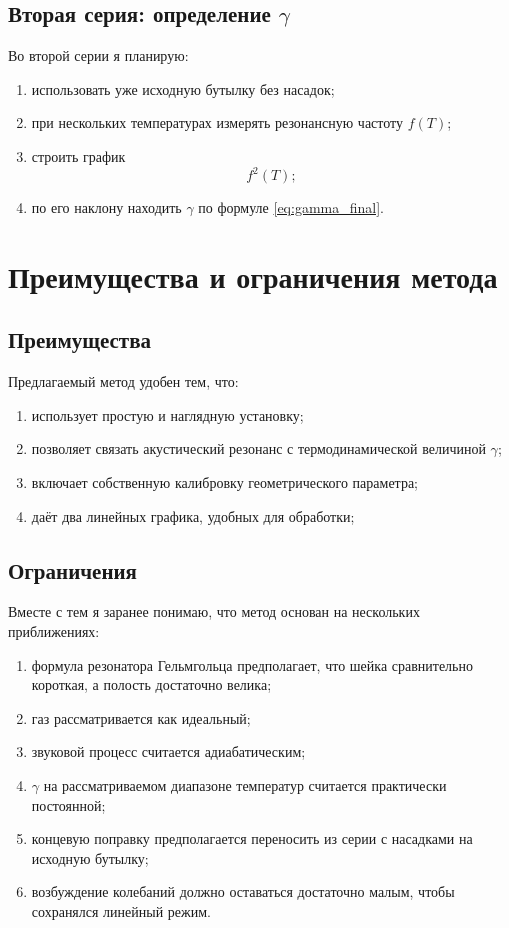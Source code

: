 \documentclass[a4paper,12pt]{article}
\begin{document}
	\subsection{Вторая серия: определение \(\gamma\)}
	
	Во второй серии я планирую:
	\begin{enumerate}[label=\arabic*)]
		\item использовать уже исходную бутылку без насадок;
		\item при нескольких температурах измерять резонансную частоту \(f(T)\);
		\item строить график
		\[
		f^2(T);
		\]
		\item по его наклону находить \(\gamma\) по формуле \eqref{eq:gamma_final}.
	\end{enumerate}
	
	\section{Преимущества и ограничения метода}
	
	\subsection{Преимущества}
	
	Предлагаемый метод удобен тем, что:
	\begin{enumerate}[label=\arabic*)]
		\item использует простую и наглядную установку;
		\item позволяет связать акустический резонанс с термодинамической величиной \(\gamma\);
		\item включает собственную калибровку геометрического параметра;
		\item даёт два линейных графика, удобных для обработки;
		
	\end{enumerate}
	
	\subsection{Ограничения}
	
	Вместе с тем я заранее понимаю, что метод основан на нескольких приближениях:
	\begin{enumerate}[label=\arabic*)]
		\item формула резонатора Гельмгольца предполагает, что шейка сравнительно короткая, а полость достаточно велика;
		\item газ рассматривается как идеальный;
		\item звуковой процесс считается адиабатическим;
		\item \(\gamma\) на рассматриваемом диапазоне температур считается практически постоянной;
		\item концевую поправку предполагается переносить из серии с насадками на исходную бутылку;
		\item возбуждение колебаний должно оставаться достаточно малым, чтобы сохранялся линейный режим.
	\end{enumerate}
	
\end{document}
